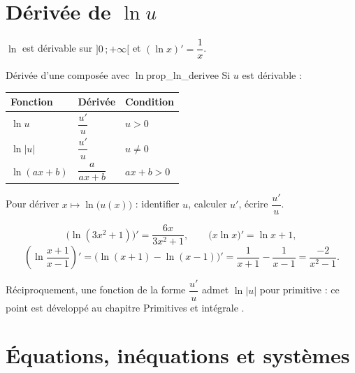 \section{Dérivée de \texorpdfstring{$\ln u$}{ln u}}

\begin{theoreme}
	$\ln$ est dérivable sur $]0\,;+\infty[$ et $(\ln x)'=\dfrac{1}{x}$.
\end{theoreme}

\begin{propriete}{Dérivée d'une composée avec $\ln$}{prop_ln_derivee}
	Si $u$ est dérivable :
	\begin{center}
	\renewcommand{\arraystretch}{2.0}
	\begin{tabular}{>{\centering\arraybackslash}p{2.8cm}
	                >{\centering\arraybackslash}p{2.6cm}
	                >{\centering\arraybackslash}p{2.6cm}}
	\hline
	Fonction & Dérivée & Condition \\
	\hline
	$\ln u$        & $\dfrac{u'}{u}$        & $u>0$ \\
	$\ln|u|$       & $\dfrac{u'}{u}$        & $u\neq 0$ \\
	$\ln(ax+b)$    & $\dfrac{a}{ax+b}$      & $ax+b>0$ \\
	\hline
	\end{tabular}
	\end{center}
\end{propriete}

\begin{methode}
	Pour dériver $x\mapsto\ln\bigl(u(x)\bigr)$ : identifier $u$, calculer $u'$,
	écrire $\dfrac{u'}{u}$.
\end{methode}

\begin{exemple}
	\[
	\bigl(\ln(3x^{2}+1)\bigr)'=\frac{6x}{3x^{2}+1},
	\qquad
	\bigl(x\ln x\bigr)'=\ln x+1,
	\]
	\[
	\left(\ln\frac{x+1}{x-1}\right)'
	=\bigl(\ln(x+1)-\ln(x-1)\bigr)'
	=\frac{1}{x+1}-\frac{1}{x-1}=\frac{-2}{x^{2}-1}.
	\]
\end{exemple}

\begin{remarque}
	Réciproquement, une fonction de la forme $\dfrac{u'}{u}$ admet
	$\ln|u|$ pour primitive : ce point est développé au chapitre
	\og Primitives et intégrale \fg.
\end{remarque}


\section{Équations, inéquations et systèmes}

